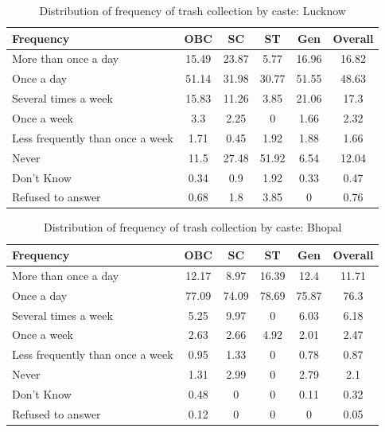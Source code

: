 \begin{table}[ht]
\centering
\caption{Distribution of frequency of trash collection by caste: Lucknow}
\label{tab:trash_caste_lucknow}
\begin{tabular}{|l|c|c|c|c|c|}
\hline
\textbf{Frequency} & \textbf{OBC} & \textbf{SC} & \textbf{ST} & \textbf{Gen} & \textbf{Overall} \\
\hline
More than once a day & 15.49 & 23.87 & 5.77 & 16.96 & 16.82 \\
\hline
Once a day & 51.14 & 31.98 & 30.77 & 51.55 & 48.63 \\
\hline
Several times a week & 15.83 & 11.26 & 3.85 & 21.06 & 17.3 \\
\hline
Once a week & 3.3 & 2.25 & 0 & 1.66 & 2.32 \\
\hline
Less frequently than once a week & 1.71 & 0.45 & 1.92 & 1.88 & 1.66 \\
\hline
Never & 11.5 & 27.48 & 51.92 & 6.54 & 12.04 \\
\hline
Don't Know & 0.34 & 0.9 & 1.92 & 0.33 & 0.47 \\
\hline
Refused to answer & 0.68 & 1.8 & 3.85 & 0 & 0.76 \\
\hline
\end{tabular}
\end{table}

\begin{table}[ht]
\centering
\caption{Distribution of frequency of trash collection by caste: Bhopal}
\label{tab:trash_caste_bhopal}
\begin{tabular}{|l|c|c|c|c|c|}
\hline
\textbf{Frequency} & \textbf{OBC} & \textbf{SC} & \textbf{ST} & \textbf{Gen} & \textbf{Overall} \\
\hline
More than once a day & 12.17 & 8.97 & 16.39 & 12.4 & 11.71 \\
\hline
Once a day & 77.09 & 74.09 & 78.69 & 75.87 & 76.3 \\
\hline
Several times a week & 5.25 & 9.97 & 0 & 6.03 & 6.18 \\
\hline
Once a week & 2.63 & 2.66 & 4.92 & 2.01 & 2.47 \\
\hline
Less frequently than once a week & 0.95 & 1.33 & 0 & 0.78 & 0.87 \\
\hline
Never & 1.31 & 2.99 & 0 & 2.79 & 2.1 \\
\hline
Don't Know & 0.48 & 0 & 0 & 0.11 & 0.32 \\
\hline
Refused to answer & 0.12 & 0 & 0 & 0 & 0.05 \\
\hline
\end{tabular}
\end{table}

